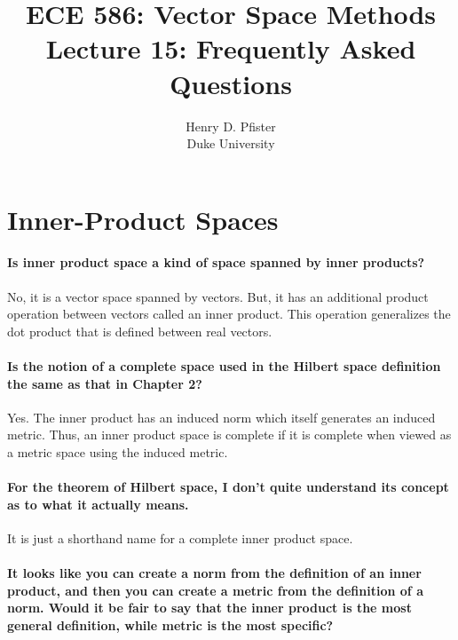 \documentclass[10pt,english]{article}
\begin{document}
\title{ECE 586: Vector Space Methods \\ Lecture 15: Frequently Asked Questions}
\author{Henry D. Pfister \\ Duke University}

\maketitle

\section{Inner-Product Spaces}
\paragraph{Is inner product space a kind of space spanned by inner products?}

No, it is a vector space spanned by vectors.
But, it has an additional product operation between vectors called an inner product.
This operation generalizes the dot product that is defined between real vectors.

\paragraph{Is the notion of a complete space used in the Hilbert space definition the same as that in Chapter 2?}
Yes.
The inner product has an induced norm which itself generates an induced metric.
Thus, an inner product space is complete if it is complete when viewed as a metric space using the induced metric.

\paragraph{For the theorem of Hilbert space, I don't quite understand its concept as to what it actually means.}

It is just a shorthand name for a complete inner product space.

\paragraph{It looks like you can create a norm from the definition of an inner product, and then you can create a metric from the definition of a norm. Would it be fair to say that the inner product is the most general definition, while metric is the most specific?}
\end{document}
